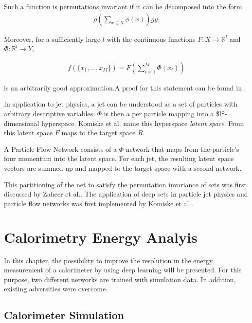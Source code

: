 \documentclass[12pt, a4paper]{thesis}
\begin{document}
Such a function is permutations invariant if it can be decomposed into
the form
\begin{align}
\rho\left( \sum_{x\in X} \phi(x) \right)gy.  
\end{align}

Moreover, for a sufficiently large \(l\) with the continuous functions
\(F: X \rightarrow \mathbb{R}^l\) and
\(\Phi: \mathbb{R}^l \rightarrow Y\),

\begin{align}
f(\{x_1, ... , x_M \}) = F(\sum_{i=1}^M \Phi(x_i))
\end{align}

is an arbitrarily good approximation.A proof for this statement can be
found in \cite{zaheer17_deep_sets}.

In application to jet physics, a jet can be understood as a set of
particles with arbitrary descriptive variables. \(\Phi\) is then a per
particle mapping into a \$l\$-dimensional hyperspace.  Komiske et
al. name this hyperspace \emph{latent space}. From this latent space \(F\) maps
to the target space \(R\).

A Particle Flow Network \cite{komiske19_energ_flow_networ} consists of
a \(\Phi\) network that maps from the particle's four momentum into
the latent space. For each jet, the resulting latent space vectors are
summed up and mapped to the target space with a second network.

This partitioning of the net to satisfy the permutation invariance of
sets was first discussed by Zaheer et al.\cite{zaheer17_deep_sets}. The
application of deep sets in particle jet physics and particle flow
networks was first implemented by Komiske et al \cite{komiske19_energ_flow_networ}.

\chapter{Calorimetry Energy Analyis}
\label{sec:orgb9c4fb7}

In this chapter, the possibility to improve the resolution in the
energy measurement of a calorimeter by using deep learning will be
presented. For this purpose, two different networks are trained with
simulation data. In addition, existing adversities were overcome.

\section{Calorimeter Simulation}
\label{sec:org905cdeb}
\end{document}
